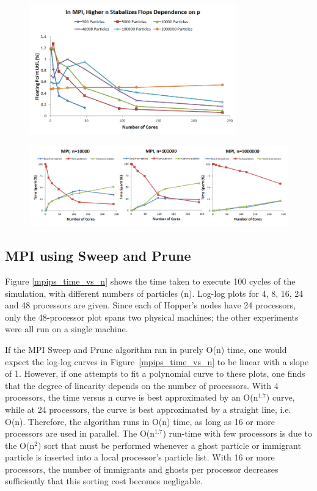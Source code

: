 \documentclass[11pt]{article} %
\begin{document}
\begin{figure}[!h]
\centering
\includegraphics[width=0.8\textwidth]{figures/mpi_mb_flops.png}
\caption{}
\label{mpi_mb_flops}
\end{figure}

\begin{figure}[!h]
\centering
\includegraphics[width=1\textwidth]{figures/mpi_mb_rtime.png}
\caption{}
\label{mpi_mb_rtime}
\end{figure}

\subsection{MPI using Sweep and Prune}

Figure \ref{mpips_time_vs_n} shows the time taken to execute 100 cycles of the simulation, with different numbers of particles (n). Log-log plots for 4, 8, 16, 24 and 48 processors are given. Since each of Hopper's nodes have 24 processors, only the 48-processor plot spans two physical machines; the other experiments were all run on a single machine.

If the MPI Sweep and Prune algorithm ran in purely O(n) time, one would expect the log-log curves in Figure~\ref{mpips_time_vs_n} to be linear with a slope of 1. However, if one attempts to fit a polynomial curve to these plots, one finds that the degree of linearity depends on the number of processors. With 4 processors, the time versus n curve is best approximated by an O(n$^{1.7}$) curve, while at 24 processors, the curve is best approximated by a straight line, i.e. O(n). Therefore, the algorithm runs in O(n) time, as long as 16 or more processors are used in parallel. The O(n$^{1.7}$) run-time with few processors is due to the O(n$^{2}$) sort that must be performed whenever a ghost particle or immigrant particle is inserted into a local processor's particle list. With 16 or more processors, the number of immigrants and ghosts per processor decreases sufficiently that this sorting cost becomes negligable.
\end{document}
